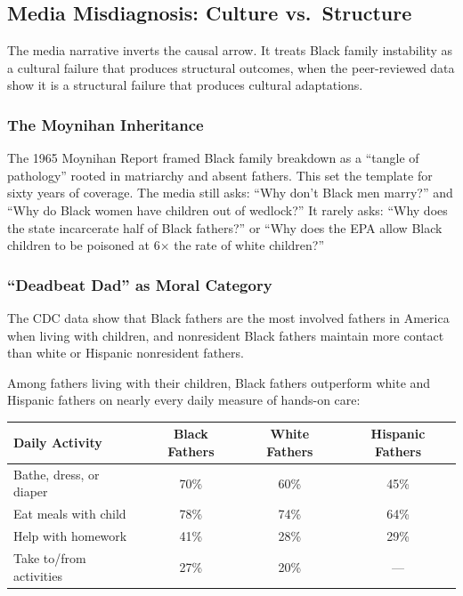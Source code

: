 \subsection{Media Misdiagnosis: Culture vs.\ Structure}

The media narrative inverts the causal arrow. It treats Black family instability as a cultural failure that produces structural outcomes, when the peer-reviewed data show it is a structural failure that produces cultural adaptations.

\subsubsection{The Moynihan Inheritance}

The 1965 Moynihan Report framed Black family breakdown as a ``tangle of pathology'' rooted in matriarchy and absent fathers. This set the template for sixty years of coverage. The media still asks: ``Why don't Black men marry?'' and ``Why do Black women have children out of wedlock?'' It rarely asks: ``Why does the state incarcerate half of Black fathers?'' or ``Why does the EPA allow Black children to be poisoned at 6$\times$ the rate of white children?''

\subsubsection{``Deadbeat Dad'' as Moral Category}

The CDC data show that Black fathers are the most involved fathers in America when living with children, and nonresident Black fathers maintain more contact than white or Hispanic nonresident fathers.

Among fathers living with their children, Black fathers outperform white and Hispanic fathers on nearly every daily measure of hands-on care:
\begin{center}
\small
\begin{tabular}{lccc}
\toprule
\textbf{Daily Activity} & \textbf{Black Fathers} & \textbf{White Fathers} & \textbf{Hispanic Fathers} \\
\midrule
Bathe, dress, or diaper & 70\% & 60\% & 45\% \\
Eat meals with child & 78\% & 74\% & 64\% \\
Help with homework & 41\% & 28\% & 29\% \\
Take to/from activities & 27\% & 20\% & --- \\
\bottomrule
\end{tabular}
\end{center}

